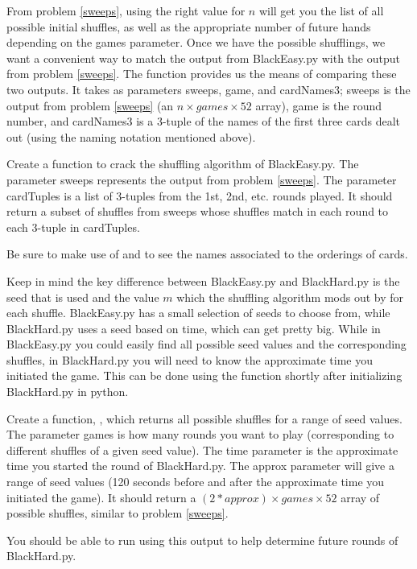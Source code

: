 From problem \ref{sweeps}, using the right value for $n$ will get you the list of all possible initial shuffles, as well as the appropriate number of future hands depending on the games parameter.
Once we have the possible shufflings, we want a convenient way to match the output from BlackEasy.py with the output from problem \ref{sweeps}.
The function  provides us the means of comparing these two outputs.
It takes as parameters sweeps, game, and cardNames3; sweeps is the output from problem \ref{sweeps} (an $n \times games \times 52$ array), game is the round number, and cardNames3 is a 3-tuple of the names of the first three cards dealt out (using the naming notation mentioned above).

\begin{problem}

Create a function  to crack the shuffling algorithm of BlackEasy.py.
The parameter sweeps represents the output from problem \ref{sweeps}.
The parameter cardTuples is a list of 3-tuples from the 1st, 2nd, etc. rounds played.
It should return a subset of shuffles from sweeps whose shuffles match in each round to each 3-tuple in cardTuples.

Be sure to make use of  and  to see the names associated to the orderings of cards.

\end{problem}

Keep in mind the key difference between BlackEasy.py and BlackHard.py is the seed that is used and the value $m$ which the shuffling algorithm mods out by for each shuffle.
BlackEasy.py has a small selection of seeds to choose from, while BlackHard.py uses a seed based on time, which can get pretty big.
While in BlackEasy.py you could easily find all possible seed values and the corresponding shuffles, in BlackHard.py you will need to know the approximate time you initiated the game.
This can be done using the  function shortly after initializing BlackHard.py in python.

\begin{problem}

Create a function, , which returns all possible shuffles for a range of seed values.
The parameter games is how many rounds you want to play (corresponding to different shuffles of a given seed value).
The time parameter is the approximate time you started the round of BlackHard.py.
The approx parameter will give a range of seed values (120 seconds before and after the approximate time you initiated the game).
It should return a $(2*approx) \times games \times 52$ array of possible shuffles, similar to problem \ref{sweeps}.

You should be able to run  using this output to help determine future rounds of BlackHard.py.

\end{problem}
